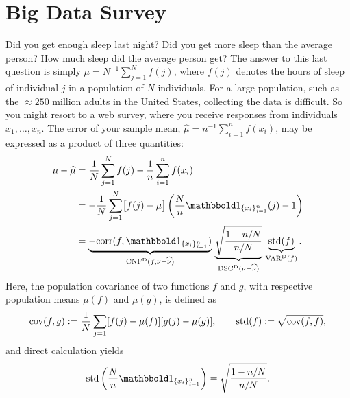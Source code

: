 \documentclass[graybox,footinfo]{svmult}
\DeclareMathOperator{\Cov}{cov}
\DeclareMathOperator{\algn}{CNF}
\DeclareMathOperator{\disc}{DSC}
\DeclareMathOperator{\Var}{VAR}
\begin{document}
\section{Big Data Survey} \label{FJH:sec:sleep} 
Did you get enough sleep last night?  Did you get more sleep than the average person?  
How much sleep did the average person get? The answer to this last question is simply 
$\mu = N^{-1} \sum_{j=1}^N f(j)$, where $f(j)$ denotes the hours of sleep of individual 
$j$ in a population of $N$ individuals.  For a large population, such as the $\approx 250$ 
million adults in the United States, collecting the data is difficult. So you might resort to a 
web survey, where you receive responses from individuals $x_1, \ldots, x_n$.  The error of 
your sample mean, $\widehat{\mu} = n^{-1} \sum_{i=1}^n f(x_i)$, may be expressed as a 
product of three quantities:
\begin{align}
\nonumber
\mu - \widehat{\mu} 
&= \frac{1}N \sum_{j=1}^N f(j) -  \frac 1n \sum_{i=1}^n f(x_i)  \\
\nonumber
&= - \frac{1}N \sum_{j=1}^N \bigl[ f(j) - \mu \bigr]\left ( \frac Nn \bbone_{\{x_i\}_{i=1}^n}(j) 
- 1 \right) \\
& = \underbrace{-\corr(f, \bbone_{\{x_i\}_{i=1}^n})}_{\algn^\Dt(f,\nu - \hnu)} \,
\underbrace{\sqrt{\frac{1 - n/N}{n/N}}}_{\disc^\Dt(\nu - \hnu)} \, 
\underbrace{\std(f)}_{\Var^\Dt(f)}.
\label{FJH:eq:surveydettrio}
\end{align}
Here, the population covariance of two functions $f$ and $g$, with respective 
population means $\mu(f)$ and $\mu(g)$, is defined as 
\begin{equation*}
\Cov(f,g) : = \frac 1N \sum_{j=1} [f(j) - \mu(f)] [g(j) - \mu(g)], \qquad 
\std(f) : = \sqrt{\Cov(f,f)},
\end{equation*}
and direct calculation yields
\begin{equation*}
\std\left(\frac Nn \bbone_{\{x_i\}_{i=1}^n}\right) = \sqrt{\frac{1 - n/N}{n/N}}.
\end{equation*}
\end{document}
